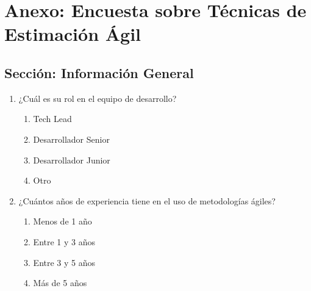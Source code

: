 \appendix
\chapter{Anexo: Encuesta sobre Técnicas de Estimación Ágil}
\section*{Sección: Información General}
\begin{enumerate}
    \item ¿Cuál es su rol en el equipo de desarrollo?
    \begin{enumerate}
        \item Tech Lead
        \item Desarrollador Senior
        \item Desarrollador Junior
        \item Otro
    \end{enumerate}
    \item ¿Cuántos años de experiencia tiene en el uso de metodologías ágiles?
    \begin{enumerate}
        \item Menos de 1 año
        \item Entre 1 y 3 años
        \item Entre 3 y 5 años
        \item Más de 5 años
    \end{enumerate}
\end{enumerate}


